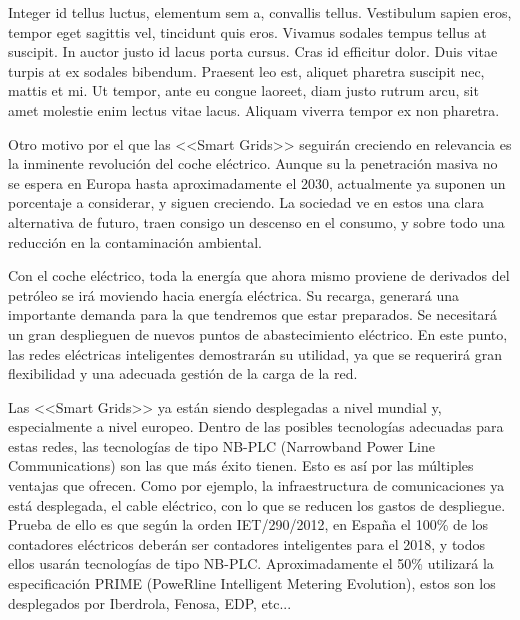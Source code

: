  Integer id tellus luctus, elementum sem a, convallis tellus. Vestibulum sapien eros, tempor eget sagittis vel, tincidunt quis eros. Vivamus sodales tempus tellus at suscipit. In auctor justo id lacus porta cursus. Cras id efficitur dolor. Duis vitae turpis at ex sodales bibendum. Praesent leo est, aliquet pharetra suscipit nec, mattis et mi. Ut tempor, ante eu congue laoreet, diam justo rutrum arcu, sit amet molestie enim lectus vitae lacus. Aliquam viverra tempor ex non pharetra.
 
 Otro motivo por el que las <<Smart Grids>> seguirán creciendo en relevancia es la inminente revolución del coche eléctrico. Aunque su la penetración masiva no se espera en Europa hasta aproximadamente el 2030, actualmente ya suponen un porcentaje a considerar, y siguen creciendo. La sociedad ve en estos una clara alternativa de futuro, traen consigo un descenso en el consumo, y sobre todo una reducción en la contaminación ambiental.
 
 Con el coche eléctrico, toda la energía que ahora mismo proviene de derivados del petróleo se irá moviendo hacia energía eléctrica. Su recarga, generará una importante demanda para la que tendremos que estar preparados. Se necesitará un gran desplieguen de nuevos puntos de abastecimiento eléctrico. En este punto, las redes eléctricas inteligentes demostrarán su utilidad, ya que se requerirá gran flexibilidad y una adecuada gestión de la carga de la red. 
 
 Las <<Smart Grids>> ya están siendo desplegadas a nivel mundial y, especialmente a nivel europeo. Dentro de las posibles tecnologías adecuadas para estas redes, las tecnologías de tipo NB-PLC (Narrowband Power Line Communications) son las que más éxito tienen. Esto es así por las múltiples ventajas que ofrecen. Como por ejemplo, la infraestructura de comunicaciones ya está desplegada, el cable eléctrico, con lo que se reducen los gastos de despliegue. Prueba de ello es que según la orden IET/290/2012, en España el 100\% de los contadores eléctricos deberán ser contadores inteligentes para el 2018, y todos ellos usarán tecnologías de tipo NB-PLC. Aproximadamente el 50\% utilizará la especificación PRIME (PoweRline Intelligent Metering Evolution), estos son los desplegados por Iberdrola, Fenosa, EDP, etc...
 
 
 
 
 
 